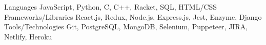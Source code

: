 
\begin{cvskills}
  \cvskill
    {Languages} %
    {JavaScript, Python, C, C++, Racket, SQL, HTML/CSS} %
  \cvskill
    {Frameworks/Libraries} %
    {React.js, Redux, Node.js, Express.js, Jest, Enzyme, Django} %
  \cvskill
    {Tools/Technologies} %
    {Git, PostgreSQL, MongoDB, Selenium, Puppeteer, JIRA, Netlify, Heroku} %
\end{cvskills}
